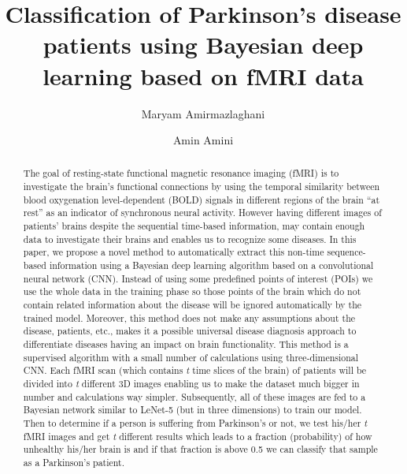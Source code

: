 \documentclass[a4paper,fleqn]{cas-dc}
\begin{document}
\let\WriteBookmarks\relax
\def\floatpagepagefraction{1}
\def\textpagefraction{.001}

\title [mode = title]{Classification of Parkinson's disease patients using Bayesian deep learning based on fMRI data}



\author[1]{Maryam Amirmazlaghani}
\cormark[1]

\author[1]{Amin Amini}


\address[1]{Department of Computer Engineering and Information Technology, Amirkabir University of Technology, Tehran, Iran}



\begin{abstract}
The goal of resting-state functional magnetic resonance imaging (fMRI) is to investigate the brain's functional connections by using the temporal similarity between blood oxygenation level-dependent (BOLD) signals in different regions of the brain “at rest” as an indicator of synchronous neural activity.
However having different images of patients' brains despite the sequential time-based information, may contain enough data to investigate their brains and enables us to recognize some diseases.
In this paper, we propose a novel method to automatically extract this non-time sequence-based information using a Bayesian deep learning algorithm based on a convolutional neural network (CNN).
Instead of using some predefined points of interest (POIs) we use the whole data in the training phase so those points of the brain which do not contain related information about the disease will be ignored automatically by the trained model.
Moreover, this method does not make any assumptions about the disease, patients, etc.,
makes it a possible universal disease diagnosis approach to differentiate diseases having an impact on brain functionality.
This method is a supervised algorithm with a small number of calculations using three-dimensional CNN.
Each fMRI scan (which contains {\it t} time slices of the brain) of patients will be divided into {\it t} different 3D images enabling us to make the dataset much bigger in number and calculations way simpler.
Subsequently, all of these images are fed to a Bayesian network similar to LeNet-5 (but in three dimensions) to train our model.
Then to determine if a person is suffering from Parkinson's or not, we test his/her {\it t} fMRI images and get {\it t} different results which leads to a fraction (probability) of how unhealthy his/her brain is and if that fraction is above 0.5 we can classify that sample as a Parkinson's patient.
\end{abstract}
\end{document}
